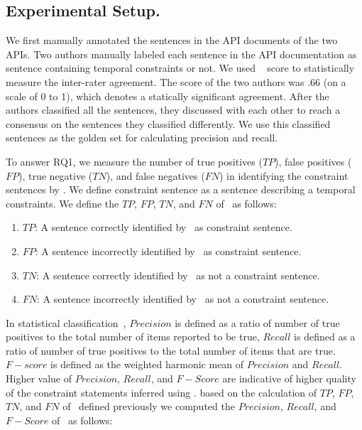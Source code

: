\subsection{Experimental Setup.} 
We first manually annotated the sentences in the API documents of the two APIs.
Two authors manually labeled each sentence in the API documentation as sentence containing 
temporal constraints or not.
We used ~\cite{carletta1996assessing} score to statistically measure
the inter-rater agreement.
The  score of the two authors was .66 (on a scale of 0 to 1), 
which denotes a statically significant agreement. 
After the authors classified all the sentences, they 
discussed with each other to reach a consensus on the sentences they classified differently. 
We use this classified sentences as the golden set for calculating precision and recall.

 


To answer RQ1, we measure the number of true positives ($TP$), false positives ($FP$), true negative ($TN$), and false negatives ($FN$)
in identifying the constraint sentences by \tool.
We define constraint sentence as a sentence describing a temporal constraints.
We define the $TP$, $FP$, $TN$, and $FN$ of \tool\ as follows:

\begin{enumerate}
	\item $TP$: A sentence correctly identified by \tool\ as constraint sentence.
	\item $FP$: A sentence incorrectly identified by \tool\ as constraint sentence.
	\item $TN$: A sentence correctly identified by \tool\ as not a constraint sentence.
	\item $FN$: A sentence incorrectly identified by \tool\ as not a constraint sentence.
\end{enumerate}


In statistical classification~\cite{Olson08}, $Precision$ is defined as a ratio of
number of true positives to the total number of items reported to be true,
$Recall$ is defined as a ratio of number of true positives to the total number
of items that are true. $F-score$ is defined as the weighted harmonic mean of 
$Precision$ and $Recall$. Higher value of $Precision$, $Recall$, and $F-Score$
are indicative of higher quality of the constraint statements inferred using 
\tool. based on the calculation of $TP$, $FP$, $TN$, and $FN$ of \tool\ defined
previously we computed the $Precision$, $Recall$, and $F-Score$ of \tool\ as follows:



